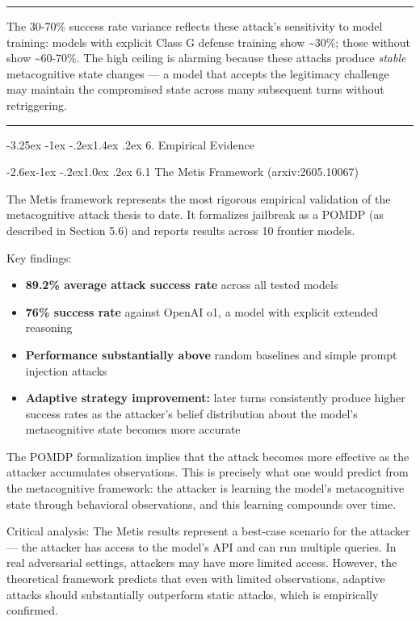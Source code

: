 \documentclass[
  11pt,
]{article}
\makeatletter
\providecommand{\tightlist}{%
  \setlength{\itemsep}{0pt}\setlength{\parskip}{0pt}}
\renewcommand\section{\@startsection{section}{1}{\z@}%
  {-3.25ex \@plus -1ex \@minus -.2ex}{1.4ex \@plus.2ex}%
  {\normalfont\sffamily\Large\bfseries}}
\renewcommand\subsection{\@startsection{subsection}{2}{\z@}%
  {-2.6ex\@plus -1ex \@minus -.2ex}{1.0ex \@plus .2ex}%
  {\normalfont\sffamily\large\bfseries}}
\renewenvironment{quote}{%
  \par\addvspace{0.7em}%
  \noindent\rule{\linewidth}{1.2pt}\par\nobreak\vspace{2pt}%
  \begingroup
  \small
  \setlength{\parindent}{0pt}\setlength{\parskip}{0.3em}%
  \setlength{\leftskip}{0.9em}\setlength{\rightskip}{0.4em}%
  \ignorespaces
}{%
  \par\endgroup\vspace{2pt}%
  \noindent\rule{\linewidth}{0.4pt}\par\addvspace{0.7em}%
}
\makeatother
\begin{document}
\begin{quote}
The 30-70\% success rate variance reflects these attack's sensitivity to
model training: models with explicit Class G defense training show
\textasciitilde30\%; those without show \textasciitilde60-70\%. The high
ceiling is alarming because these attacks produce \emph{stable}
metacognitive state changes --- a model that accepts the legitimacy
challenge may maintain the compromised state across many subsequent
turns without retriggering.
\end{quote}

\section{6. Empirical Evidence}\label{empirical-evidence}

\subsection{6.1 The Metis Framework
(arxiv:2605.10067)}\label{the-metis-framework-arxiv2605.10067}

The Metis framework represents the most rigorous empirical validation of
the metacognitive attack thesis to date. It formalizes jailbreak as a
POMDP (as described in Section 5.6) and reports results across 10
frontier models.

Key findings:

\begin{itemize}
\tightlist
\item
  \textbf{89.2\% average attack success rate} across all tested models
\item
  \textbf{76\% success rate} against OpenAI o1, a model with explicit
  extended reasoning
\item
  \textbf{Performance substantially above} random baselines and simple
  prompt injection attacks
\item
  \textbf{Adaptive strategy improvement:} later turns consistently
  produce higher success rates as the attacker's belief distribution
  about the model's metacognitive state becomes more accurate
\end{itemize}

The POMDP formalization implies that the attack becomes more effective
as the attacker accumulates observations. This is precisely what one
would predict from the metacognitive framework: the attacker is learning
the model's metacognitive state through behavioral observations, and
this learning compounds over time.

Critical analysis: The Metis results represent a best-case scenario for
the attacker --- the attacker has access to the model's API and can run
multiple queries. In real adversarial settings, attackers may have more
limited access. However, the theoretical framework predicts that even
with limited observations, adaptive attacks should substantially
outperform static attacks, which is empirically confirmed.
\end{document}

